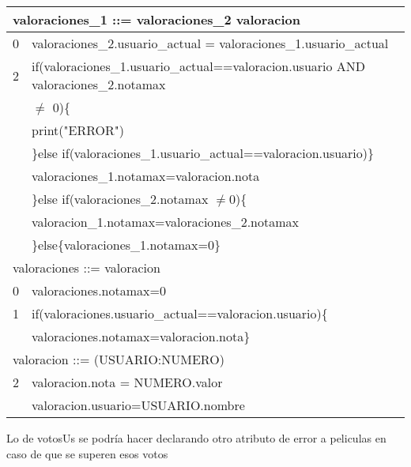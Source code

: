 \begin{problem}[2]
\begin{tabular}{|c|l|}
\hline
\multicolumn{2}{|l|}{valoraciones\_1 ::= valoraciones\_2 valoracion} \\
\hline
0 & valoraciones\_2.usuario\_actual = valoraciones\_1.usuario\_actual\\
\hline
2 & if(valoraciones\_1.usuario\_actual==valoracion.usuario AND valoraciones\_2.notamax\\& $\neq$ 0)\{\\ &
print("ERROR")\\&
\}else if(valoraciones\_1.usuario\_actual==valoracion.usuario)\}\\&
valoraciones\_1.notamax=valoracion.nota\\&
\}else if(valoraciones\_2.notamax $\neq$0)\{\\&
valoracion\_1.notamax=valoraciones\_2.notamax\\&
\}else\{valoraciones\_1.notamax=0\}\\
\hline
\multicolumn{2}{|l|}{valoraciones ::= valoracion} \\
\hline
 0 & valoraciones.notamax=0 \\
 \hline
 1 & if(valoraciones.usuario\_actual==valoracion.usuario)\{\\ &
 valoraciones.notamax=valoracion.nota\}\\
\hline
\multicolumn{2}{|l|}{valoracion ::= (USUARIO:NUMERO)} \\
\hline
 2 & valoracion.nota = NUMERO.valor\\ & valoracion.usuario=USUARIO.nombre\\
 \hline

\end{tabular}


Lo de votosUs se podría hacer declarando otro atributo de error a peliculas en caso de que se superen esos votos
\end{problem}


